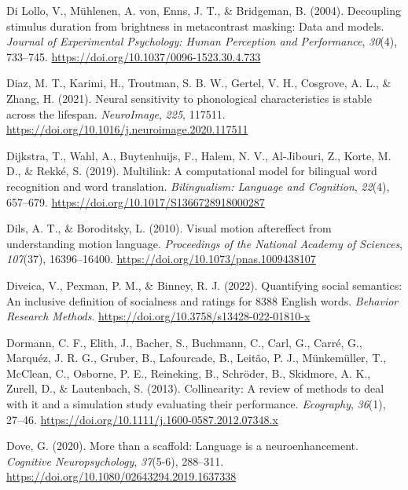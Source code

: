 \documentclass[
  12pt,
  man,floatsintext]{apa7}
\newlength{\cslhangindent}
\newlength{\cslentryspacingunit} %
\newenvironment{CSLReferences}[2] %
 {%
  \setlength{\parindent}{0pt}
  \ifodd #1
  \let\oldpar\par
  \def\par{\hangindent=\cslhangindent\oldpar}
  \fi
  \setlength{\parskip}{#2\cslentryspacingunit}
 }%
 {}
\begin{document}
\begin{CSLReferences}{1}{0}
\leavevmode{}%
Di Lollo, V., Mühlenen, A. von, Enns, J. T., \& Bridgeman, B. (2004). Decoupling stimulus duration from brightness in metacontrast masking: {Data} and models. \emph{Journal of Experimental Psychology: Human Perception and Performance}, \emph{30}(4), 733--745. \url{https://doi.org/10.1037/0096-1523.30.4.733}

\leavevmode{}%
Diaz, M. T., Karimi, H., Troutman, S. B. W., Gertel, V. H., Cosgrove, A. L., \& Zhang, H. (2021). Neural sensitivity to phonological characteristics is stable across the lifespan. \emph{NeuroImage}, \emph{225}, 117511. \url{https://doi.org/10.1016/j.neuroimage.2020.117511}

\leavevmode{}%
Dijkstra, T., Wahl, A., Buytenhuijs, F., Halem, N. V., Al-Jibouri, Z., Korte, M. D., \& Rekké, S. (2019). Multilink: {A} computational model for bilingual word recognition and word translation. \emph{Bilingualism: Language and Cognition}, \emph{22}(4), 657--679. \url{https://doi.org/10.1017/S1366728918000287}

\leavevmode{}%
Dils, A. T., \& Boroditsky, L. (2010). Visual motion aftereffect from understanding motion language. \emph{Proceedings of the National Academy of Sciences}, \emph{107}(37), 16396--16400. \url{https://doi.org/10.1073/pnas.1009438107}

\leavevmode{}%
Diveica, V., Pexman, P. M., \& Binney, R. J. (2022). Quantifying social semantics: {An} inclusive definition of socialness and ratings for 8388 {English} words. \emph{Behavior Research Methods}. \url{https://doi.org/10.3758/s13428-022-01810-x}

\leavevmode{}%
Dormann, C. F., Elith, J., Bacher, S., Buchmann, C., Carl, G., Carré, G., Marquéz, J. R. G., Gruber, B., Lafourcade, B., Leitão, P. J., Münkemüller, T., McClean, C., Osborne, P. E., Reineking, B., Schröder, B., Skidmore, A. K., Zurell, D., \& Lautenbach, S. (2013). Collinearity: A review of methods to deal with it and a simulation study evaluating their performance. \emph{Ecography}, \emph{36}(1), 27--46. \url{https://doi.org/10.1111/j.1600-0587.2012.07348.x}

\leavevmode{}%
Dove, G. (2020). More than a scaffold: {Language} is a neuroenhancement. \emph{Cognitive Neuropsychology}, \emph{37}(5-6), 288--311. \url{https://doi.org/10.1080/02643294.2019.1637338}


\end{CSLReferences}
\end{document}
